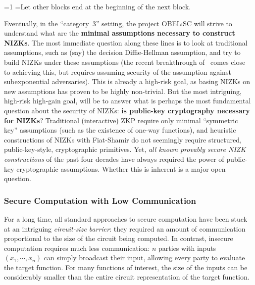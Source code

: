 \documentclass[oneside, a4paper, onecolumn, 11pt]{article}
\newcommand{\OBELiSC}{\textsc{OBELiSC}\xspace}
\newcounter{alphasect}
\def\alphainsection{0}
\newenvironment{alphasection}{%
  \ifnum\alphainsection=1%
    \errhelp={Let other blocks end at the beginning of the next block.}
    \errmessage{Nested Alpha section not allowed}
  \fi%
  \setcounter{alphasect}{0}
  \def\alphainsection{1}
}{%
  \setcounter{alphasect}{0}
  \def\alphainsection{0}
}%
\begin{document}
\begin{alphasection}
Eventually, in the ``category~3'' setting, the project \OBELiSC will strive to understand what are the \textbf{minimal assumptions necessary to construct NIZKs}. The most immediate question along these lines is to look at traditional assumptions, such as (say) the decision Diffie-Hellman assumption, and try to build NIZKs under these assumptions (the recent breakthrough of~\cite{EC:JaiJin21} comes close to achieving this, but requires assuming security of the assumption against subexponential adversaries). This is already a high-risk goal, as basing NIZKs on new assumptions has proven to be highly non-trivial. But the most intriguing, high-risk high-gain goal, will be to answer what is perhaps the most fundamental question about the security of NIZKs: \textbf{is public-key cryptography necessary for NIZKs}? Traditional (interactive) ZKP require only minimal ``symmetric key'' assumptions (such as the existence of one-way functions), and heuristic constructions of NIZKs with Fiat-Shamir do not seemingly require structured, public-key-style, cryptographic primitives. Yet, \emph{all known provably secure NIZK constructions} of the past four decades have always required the power of public-key cryptographic assumptions. Whether this is inherent is a major open question.

\subsubsection{Secure Computation with Low Communication}
\label{subsub:lowcomm}

For a long time, all standard approaches to secure computation have been stuck at an intriguing \emph{circuit-size barrier}: they required an amount of communication proportional to the size of the circuit being computed. In contrast, insecure computation requires much less communication: $n$ parties with inputs $(x_1, \cdots, x_n)$ can simply broadcast their input, allowing every party to evaluate the target function. For many functions of interest, the size of the inputs can be considerably smaller than the entire circuit representation of the target function.


\end{alphasection}
\end{document}
